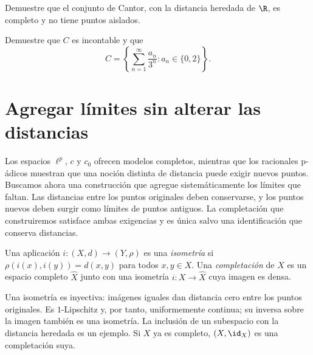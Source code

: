 \begin{ejercicio}\label{ej:lectura-8-6}
Demuestre que el conjunto de Cantor, con la distancia heredada de $\R$, es completo y no tiene puntos aislados.
\end{ejercicio}


\begin{ejercicio}\label{ej:lectura-8-7}
Demuestre que $C$ es incontable y que
\[
 C=\left\{\sum_{n=1}^\infty\frac{a_n}{3^n}:a_n\in\{0,2\}\right\}.
\]
\end{ejercicio}


\section{Agregar límites sin alterar las distancias}
\label{lectura:09}
Los espacios $\ell^p$, $c$ y $c_0$ ofrecen modelos completos, mientras que los racionales p-ádicos muestran que una noción distinta de distancia puede exigir nuevos puntos. Buscamos ahora una construcción que agregue sistemáticamente los límites que faltan. Las distancias entre los puntos originales deben conservarse, y los puntos nuevos deben surgir como límites de puntos antiguos. La completación que construiremos satisface ambas exigencias y es única salvo una identificación que conserva distancias.

\begin{definicion}
Una aplicación $i:(X,d)\to(Y,\rho)$ es una \emph{isometría} si $\rho(i(x),i(y))=d(x,y)$ para todos $x,y\in X$. Una \emph{completación} de $X$ es un espacio completo $\widehat X$ junto con una isometría $i:X\to\widehat X$ cuya imagen es densa.
\end{definicion}
Una isometría es inyectiva: imágenes iguales dan distancia cero entre los puntos originales. Es $1$-Lipschitz y, por tanto, uniformemente continua; su inversa sobre la imagen también es una isometría. La inclusión de un subespacio con la distancia heredada es un ejemplo. Si $X$ ya es completo, $(X,\id_X)$ es una completación suya.

